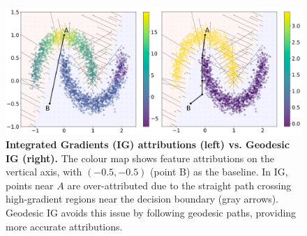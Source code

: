 \begin{figure}[t!]
\vskip -0.1in
\begin{center}
\centerline{\includegraphics[width=\columnwidth]{figures/half_moons_y.png}}
\vskip -0.2in

\caption{\textbf{Integrated Gradients (IG) attributions (left) vs. Geodesic IG (right).} The colour map shows feature attributions on the vertical axis, with $(-0.5, -0.5)$ (point B) as the baseline. In IG, points near $A$ are over-attributed due to the straight path crossing high-gradient regions near the decision boundary (gray arrows). Geodesic IG avoids this issue by following geodesic paths, providing more accurate attributions.}
\label{fig:ig}
\end{center}
\vskip -0.2in
\end{figure}

